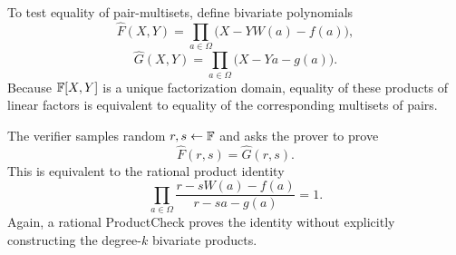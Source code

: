 To test equality of pair-multisets, define bivariate polynomials
\[
    \widehat F(X,Y)=\prod_{a\in\Omega}\bigl(X-YW(a)-f(a)\bigr),
\]
\[
    \widehat G(X,Y)=\prod_{a\in\Omega}\bigl(X-Ya-g(a)\bigr).
\]
Because $\mathbb{F}[X,Y]$ is a unique factorization domain, equality of these products of linear factors is equivalent to equality of the corresponding multisets of pairs.

The verifier samples random $r,s\leftarrow\mathbb{F}$ and asks the prover to prove
\[
    \widehat F(r,s)=\widehat G(r,s).
\]
This is equivalent to the rational product identity
\[
    \prod_{a\in\Omega}
    \frac{r-sW(a)-f(a)}{r-sa-g(a)}
    =1.
\]
Again, a rational ProductCheck proves the identity without explicitly constructing the degree-$k$ bivariate products.

